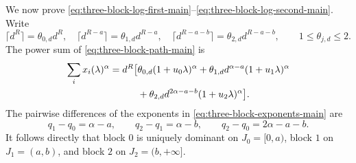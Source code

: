 \documentclass[aps,pra,11pt,onecolumn,nofootinbib,tightenlines]{revtex4-2}
\theoremstyle{definition}
\begin{document}
We now prove \eqref{eq:three-block-log-first-main}--\eqref{eq:three-block-log-second-main}.  Write
\begin{equation}
 \lceil d^R\rceil=\theta_{0,d}d^R,
 \quad
 \lceil d^{R-a}\rceil=\theta_{1,d}d^{R-a},
 \quad
 \lceil d^{R-a-b}\rceil=\theta_{2,d}d^{R-a-b},
 \qquad1\leq\theta_{j,d}\leq2.
 \label{eq:app-three-ceiling}
\end{equation}
The power sum of \eqref{eq:three-block-path-main} is
\begin{align}
 \sum_i x_i(\lambda)^\alpha
 =d^R\bigl[&\theta_{0,d}(1+u_0\lambda)^\alpha
 +\theta_{1,d}d^{\alpha-a}(1+u_1\lambda)^\alpha
 \notag\\
 &+\theta_{2,d}d^{2\alpha-a-b}(1+u_2\lambda)^\alpha\bigr].
 \label{eq:app-three-power-sum}
\end{align}
The pairwise differences of the exponents in \eqref{eq:three-block-exponents-main} are
\begin{equation}
 q_1-q_0=\alpha-a,
 \qquad
 q_2-q_1=\alpha-b,
 \qquad
 q_2-q_0=2\alpha-a-b.
 \label{eq:app-three-exponent-differences}
\end{equation}
It follows directly that block $0$ is uniquely dominant on $J_0=[0,a)$, block $1$ on $J_1=(a,b)$, and block $2$ on $J_2=(b,+\infty]$.
\end{document}
